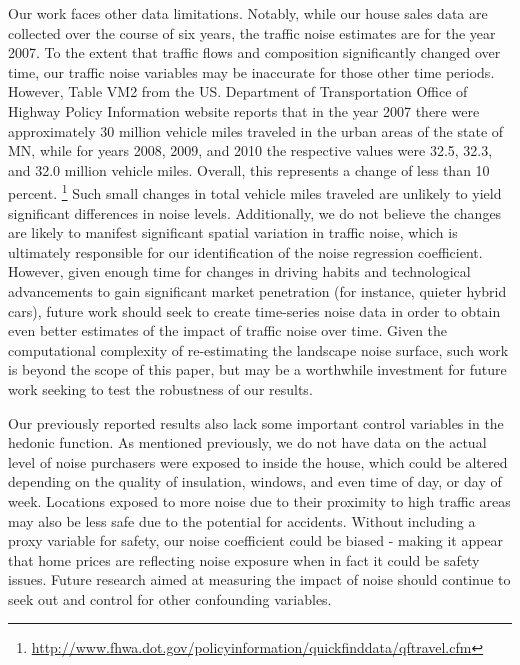 \documentclass{article}\usepackage{graphicx, color}
\begin{document}
Our work faces other data limitations. Notably, while our house sales data are collected over the course of six years, the traffic noise estimates are for the year 2007. To the extent that traffic flows and composition significantly changed over time, our traffic noise variables may be inaccurate for those other time periods. However, Table VM2 from the US. Department of Transportation Office of Highway Policy Information website reports that in the year 2007 there were approximately 30 million vehicle miles traveled in the urban areas of the state of MN, while for years 2008, 2009, and 2010 the respective values were 32.5, 32.3, and 32.0 million vehicle miles. Overall, this represents a change of less than 10 percent. \footnote{\url{http://www.fhwa.dot.gov/policyinformation/quickfinddata/qftravel.cfm}} Such small changes in total vehicle miles traveled are unlikely to yield significant differences in noise levels. Additionally, we do not believe the changes are likely to manifest significant spatial variation in traffic noise, which is ultimately responsible for our identification of the noise regression coefficient. However, given enough time for changes in driving habits and technological advancements to gain significant market penetration (for instance, quieter hybrid cars), future work should seek to create time-series noise data in order to obtain even better estimates of the impact of traffic noise over time. Given the computational complexity of re-estimating the landscape noise surface, such work is beyond the scope of this paper, but may be a worthwhile investment for future work seeking to test the robustness of our results.

Our previously reported results also lack some important control variables in the hedonic function. As mentioned previously, we do not have data on the actual level of noise purchasers were exposed to inside the house, which could be altered depending on the quality of insulation, windows, and even time of day, or day of week. Locations exposed to more noise due to their proximity to high traffic areas may also be less safe due to the potential for accidents. Without including a proxy variable for safety, our noise coefficient could be biased - making it appear that home prices are reflecting noise exposure when in fact it could be safety issues. Future research aimed at measuring the impact of noise should continue to seek out and control for other confounding variables. 
\end{document}

